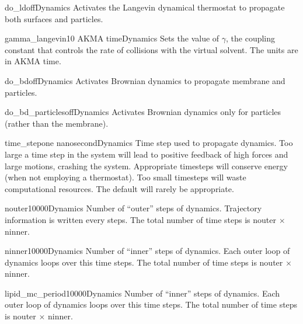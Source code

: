 \begin{optionSummary}{do\_ld}{off}{Dynamics}
Activates the Langevin dynamical thermostat to propagate both surfaces and particles.
\end{optionSummary}
\begin{optionSummary}{gamma\_langevin}{10 AKMA time}{Dynamics}
Sets the value of $\gamma$, the coupling constant that controls the rate of collisions with the virtual solvent. The units are in AKMA time.
\end{optionSummary}
\begin{optionSummary}{do\_bd}{off}{Dynamics}
Activates Brownian dynamics to propagate membrane and particles.
\end{optionSummary}
\begin{optionSummary}{do\_bd\_particles}{off}{Dynamics}
Activates Brownian dynamics only for particles (rather than the membrane).
\end{optionSummary}
\begin{optionSummary}{time\_step}{one nanosecond}{Dynamics}
Time step used to propagate dynamics.
Too large a time step in the system will lead to positive feedback of high forces and large motions, crashing the system.
Appropriate timesteps will conserve energy (when not employing a thermostat).
Too small timesteps will waste computational resources.
The default will rarely be appropriate.
\end{optionSummary}
\begin{optionSummary}{nouter}{10000}{Dynamics}
Number of ``outer'' steps of dynamics.
Trajectory information is written every  steps.
The total number of time steps is nouter $\times$ ninner.
\end{optionSummary}
\begin{optionSummary}{ninner}{10000}{Dynamics}
Number of ``inner'' steps of dynamics.
Each outer loop of dynamics loops over this  time steps.
The total number of time steps is nouter $\times$ ninner.
\end{optionSummary}

\begin{optionSummary}{lipid\_mc\_period}{10000}{Dynamics}
Number of ``inner'' steps of dynamics.
Each outer loop of dynamics loops over this  time steps.
The total number of time steps is nouter $\times$ ninner.
\end{optionSummary}


